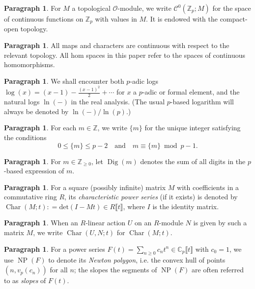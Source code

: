\documentclass[12pt]{amsart}
\theoremstyle{definition}
\newtheorem{para}[subsection]{Paragraph}
\numberwithin{equation}{subsection}
\def\calC{\mathcal{C}}
\def\calO{\mathcal{O}}
\def\CC{\mathbb{C}}
\def\ZZ{\mathbb{Z}}
\DeclareMathOperator{\NP}{NP}
\DeclareMathOperator{\Dig}{Dig}
\renewcommand{\det}{\mathrm{det}}
\DeclareMathOperator{\Char}{Char}
\begin{document}
\begin{para}
\label{P:para_042}
For $M$ a topological $\calO$-module, we write $\calC^0(\ZZ_p; M)$ for the space of continuous functions on $\ZZ_p$ with values in $M$. It is endowed with the compact-open topology.
\end{para}

\begin{para}
\label{P:para_043}
All maps and characters are continuous with respect to the relevant topology. All hom spaces in this paper refer to the spaces of continuous homomorphisms.
\end{para}

\begin{para}
\label{P:para_044}
We shall encounter both $p$-adic logs $\log(x) = (x-1) - \frac{(x-1)^2}2 + \cdots $ for $x$ a $p$-adic or formal element,  and the natural logs $\ln(-)$ in the real analysis. (The usual $p$-based logarithm will always be denoted by $\ln(-)/\ln(p)$.)
\end{para}

\begin{para}
\label{P:para_045}
For each $m \in \ZZ$, we write $\{m\}$ for the unique integer
satisfying the conditions 
$$0\leq \{m\}\leq p-2 \quad \textrm{and} \quad m\equiv \{m\}
\bmod{p-1}.$$
\end{para}

\begin{para}
\label{P:para_046}
For $m \in \ZZ_{\geq 0}$, let $\Dig(m)$ denotes the sum of all digits in the $p$-based expression of $m$.
\end{para}

\begin{para}
\label{P:para_047}
For a square (possibly infinite) matrix $M$ with coefficients in a commutative ring $R$, its \emph{characteristic power series} (if it exists) is denoted by $\Char(M;t) : = \det(I- Mt) \in R\llbracket t\rrbracket$, where $I$ is the identity matrix.
\end{para}

\begin{para}
\label{P:para_048}
When an $R$-linear action $U$ on an $R$-module $N$ is given by such a matrix $M$, we write $\Char (U, N; t)$ for $\Char (M;t)$.
\end{para}

\begin{para}
\label{P:para_049}
For a power series $F(t) = \sum_{n \geq 0} c_nt^n \in \CC_p\llbracket t\rrbracket$ with $c_0=1$, we use $\NP(F)$ to denote its \emph{Newton polygon}, i.e. the convex hull of points $(n, v_p(c_n))$ for all $n$; the slopes the segments of $\NP(F)$ are often referred to as \emph{slopes} of $F(t)$.
\end{para}
\end{document}
